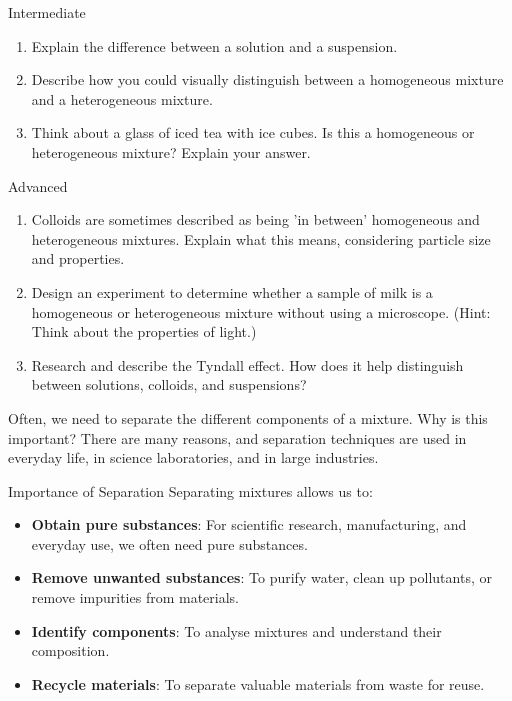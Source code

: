 \begin{tieredquestions}{Intermediate}
\begin{enumerate}
    \item Explain the difference between a solution and a suspension.
    \item Describe how you could visually distinguish between a homogeneous mixture and a heterogeneous mixture.
    \item  Think about a glass of iced tea with ice cubes. Is this a homogeneous or heterogeneous mixture? Explain your answer.
\end{enumerate}
\end{tieredquestions}

\begin{tieredquestions}{Advanced}
\begin{enumerate}
    \item  Colloids are sometimes described as being 'in between' homogeneous and heterogeneous mixtures. Explain what this means, considering particle size and properties.
    \item  Design an experiment to determine whether a sample of milk is a homogeneous or heterogeneous mixture without using a microscope. (Hint: Think about the properties of light.)
    \item  Research and describe the Tyndall effect. How does it help distinguish between solutions, colloids, and suspensions?
\end{enumerate}
\end{tieredquestions}


\FloatBarrier


Often, we need to separate the different components of a mixture.  Why is this important? There are many reasons, and separation techniques are used in everyday life, in science laboratories, and in large industries.

\begin{keyconcept}{Importance of Separation}
Separating mixtures allows us to:
\begin{itemize}
    \item \textbf{Obtain pure substances}:  For scientific research, manufacturing, and everyday use, we often need pure substances.
    \item \textbf{Remove unwanted substances}:  To purify water, clean up pollutants, or remove impurities from materials.
    \item \textbf{Identify components}:  To analyse mixtures and understand their composition.
    \item \textbf{Recycle materials}: To separate valuable materials from waste for reuse.
\end{itemize}
\end{keyconcept}

